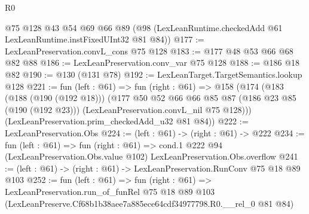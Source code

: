 \begin{lexlean}{R0}
\begin{coremodule}
    @75
    @128
    @43
    @54
    @69
    @66
    @89
    (@98 (LexLeanRuntime.checkedAdd @61 LexLeanRuntime.instFixedUInt32 @81 @84))
@177 := LexLeanPreservation.convL_cons @75 @128
@183 := @177 @48 @53 @66 @68 @82 @88
@186 := LexLeanPreservation.conv_var @75 @128
@188 := @186 @18 @82
@190 := @130 (@131 @78)
@192 := LexLeanTarget.TargetSemantics.lookup @128
@221 := fun (left : @61) =>
  fun (right : @61) =>
  @158
    (@174
      (@183
        (@188 (@190 (@192 @18)))
        (@177
          @50
          @52
          @66
          @66
          @85
          @87
          (@186 @23 @85 (@190 (@192 @23)))
          (LexLeanPreservation.convL_nil @75 @128)))
      (LexLeanPreservation.prim_checkedAdd_u32 @81 @84))
@222 := LexLeanPreservation.Obs
@224 := (left : @61) -> (right : @61) -> @222
@234 := fun (left : @61) =>
  fun (right : @61) =>
  cond.{1} @222 @94 (LexLeanPreservation.Obs.value @102) LexLeanPreservation.Obs.overflow
@241 := (left : @61) -> (right : @61) -> LexLeanPreservation.RunConv @75 @18 @89 @103
@252 := fun (left : @61) =>
  fun (right : @61) =>
  LexLeanPreservation.run_of_funRel
    @75
    @18
    @89
    @103
    (LexLeanPreserve.Cf68b1b38aee7a885ece64cdf34977798.R0.__rel_0 @81 @84)
\end{coremodule}
\end{lexlean}
